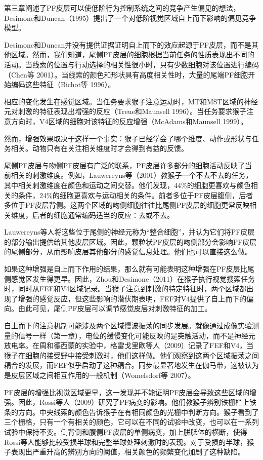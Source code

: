 第三章阐述了PF皮层可以使低阶行为控制系统之间的竞争产生偏见的想法，Desimone和Duncan（1995）提出了一个对低阶视觉区域自上而下影响的偏见竞争模型。

Desimone和Duncan并没有提供证据证明自上而下的效应起源于PF皮层，而不是其他区域。然而，我们知道，尾侧PF皮层的细胞根据当前任务的性质表现出不同的活动。当线索的位置与行动选择的相关性很小时，只有少数细胞对该位置进行编码（Chen等 2001）。当线索的颜色和形状具有高度相关性时，大量的尾端PF细胞开始编码这些特征（Bichot等 1996）。

相应的变化发生在感觉区域。当任务要求猴子注意运动时，MT和MST区域的神经元对刺激的特征表现出增强的反应（Treue和Maunsell 1996）。当任务要求猴子注意方向时，V4区域的细胞对该特征的反应增强（McAdams和Maunsell 1999）。

然而，增强效果取决于这样一个事实：猴子已经学会了哪个维度、动作或形状与任务相关。动物只有在关注相关维度时才会得到有益的反馈。

尾侧PF皮层与吻侧PF皮层有广泛的联系，PF皮层许多部分的细胞活动反映了当前相关的刺激维度。例如，Lauwereyns等（2001）教猴子一个不去不去的任务，其中相关刺激维度在颜色和运动之间交替。他们发现，44\%的细胞更喜欢与颜色相关的条件，24\%的细胞更喜欢与运动相关的条件。前者多位于PF皮层腹侧，后者多位于PF皮层背侧。这两个区域的吻侧细胞往往比尾侧PF皮层的细胞更常反映相关维度，后者的细胞通常编码适当的反应：去或不去。

Lauwereyns等人将这些位于尾侧的神经元称为“整合细胞”，并认为它们将PF皮层的部分输出提供给其他皮层区域。因此，颗粒状PF皮层的吻侧部分会影响PF皮层的尾侧部分，从而影响皮层其他部分的感觉信息处理。他们也可以直接这么做。

如果这种增强是自上而下作用的结果，那么就有可能表明这种增强在PF皮层比尾侧感觉区发生得更早。因此，Zhou和Desimone（2011）在猴子执行视觉搜索任务时，同时从FEF和V4区域记录。当猴子注意到刺激的特定特征时，两个区域都出现了增强的感觉反应，但这些影响的潜伏期表明，FEF对V4提供了自上而下的偏向。由此可见，尾侧PF皮层可以调节感觉皮层对刺激特征的加工。

自上而下的注意机制可能涉及两个区域慢波振荡的同步发展。就像通过成像实验测量的信号一样（第一章），电位的缓慢变化可能反映的是突触活动，而不是神经元放电率。在周和德西蒙的实验中，格雷戈里欧等人（2009）记录了FEF和V4，当猴子在细胞的接受野中接受刺激时，他们这样做。他们观察到这两个区域振荡之间耦合的发展，而FEF似乎启动了这种耦合。同步最显著地发生在伽马带，这被认为是皮层区域之间相互作用的一般机制（Womelsdorf等 2007）。

PF皮层的增强比视觉区域更早，这一发现并不能证明PF皮层会导致这些区域的增强。因此，Rossi等人（2009）研究了PF病变的影响。他们教猴子辨别铁栅栏上铁条的方向。中央线索的颜色告诉猴子在有相同颜色的光栅中判断方向。猴子看到了三个栅格，只有一个有相关的颜色，它可以在不同的试验中改变，也可以在一系列试验中保持不变。侧背侧和腹侧PF皮层的单侧病变，加上胼胝体的横断，使得Rossi等人能够比较受损半球和完整半球处理刺激时的表现。对于受损的半球，猴子表现出严重升高的辨别方向的阈值，相关颜色的频繁变化加剧了这种缺陷。

